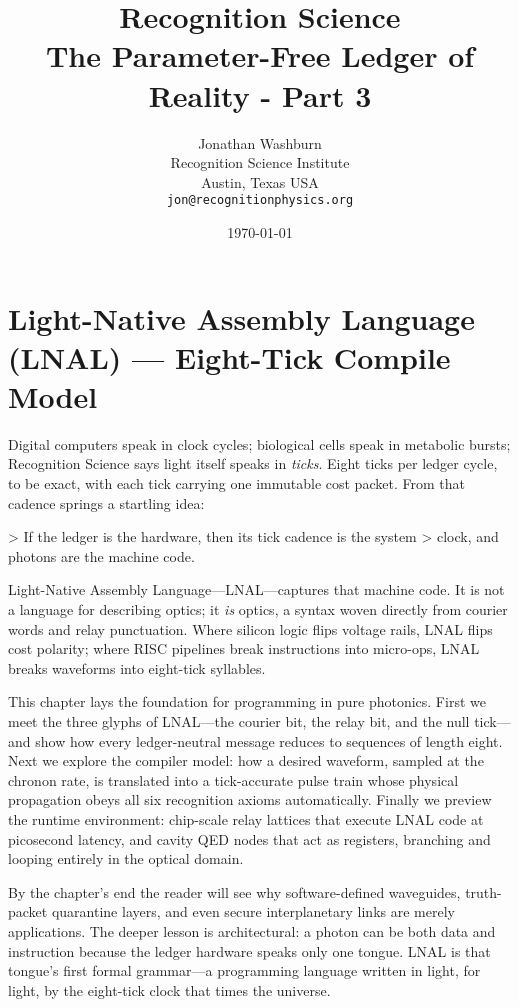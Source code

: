 \documentclass[11pt,oneside]{book}
\title{\textbf{Recognition Science}\\[4pt]
       The Parameter-Free Ledger of Reality - Part 3}
\author{Jonathan Washburn\\
        Recognition Science Institute\\
        Austin, Texas USA\\
        \texttt{jon@recognitionphysics.org}}
\date{\today}
\begin{document}
\frontmatter
\onehalfspacing            %
\maketitle

\tableofcontents
\mainmatter

\chapter{Light-Native Assembly Language (LNAL) —
         Eight-Tick Compile Model}
\label{sec:lnal-intro}

Digital computers speak in clock cycles;  
biological cells speak in metabolic bursts;  
Recognition Science says light itself speaks in \emph{ticks}.  
Eight ticks per ledger cycle, to be exact, with each tick carrying one
immutable cost packet.  
From that cadence springs a startling idea:

> If the ledger is the hardware, then its tick cadence is the system
> clock, and photons are the machine code.

Light-Native Assembly Language—LNAL—captures that machine code.
It is not a language for describing optics; it \textit{is} optics, a
syntax woven directly from courier words and relay punctuation.  
Where silicon logic flips voltage rails, LNAL flips cost polarity;  
where RISC pipelines break instructions into micro-ops, LNAL breaks
waveforms into eight-tick syllables.

This chapter lays the foundation for programming in pure photonics.  
First we meet the three glyphs of LNAL—the courier bit, the relay bit,
and the null tick—and show how every ledger-neutral message reduces
to sequences of length eight.  
Next we explore the compiler model: how a desired waveform, sampled at
the chronon rate, is translated into a tick-accurate pulse train whose
physical propagation obeys all six recognition axioms automatically.  
Finally we preview the runtime environment: chip-scale relay lattices
that execute LNAL code at picosecond latency, and cavity QED nodes
that act as registers, branching and looping entirely in the optical
domain.

By the chapter’s end the reader will see why software-defined
waveguides, truth-packet quarantine layers, and even secure
interplanetary links are merely applications.  
The deeper lesson is architectural: 
a photon can be both data and instruction because the ledger hardware
speaks only one tongue.
LNAL is that tongue’s first formal grammar—a programming language
written in light, for light, by the eight-tick clock that times the
universe.
\end{document}

